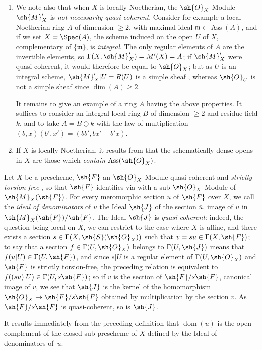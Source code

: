 \begin{remarks}[20.2.13]
\begin{enumerate}[label=(\roman*)]
  \item We note also that when $X$ is locally Noetherian, the $\sh{O}_X$-Module $\sh{M}'_X$ is \emph{not necessarily quasi-coherent}.
  Consider for example a local Noetherian ring $A$ of dimension $\geq 2$, with maximal ideal $\mathfrak{m}\in\operatorname{Ass}(A)$, and if we set $X=\Spec(A)$, the scheme induced on the open $U$ of $X$, complementary of $\{\mathfrak{m}\}$, is \emph{integral}.
  The only regular elements of $A$ are the invertible elements, so $\Gamma(X,\sh{M}'_X)=M'(X)=A$;
  if $\sh{M}'_X$ were quasi-coherent, it would therefore be equal to $\sh{O}_X$;
  but as $U$ is an integral scheme, $\sh{M}'_X|U=R(U)$ is a simple sheaf , whereas $\sh{O}_U$ is not a simple sheaf since $\dim(A)\geq 2$.

  It remains to give an example of a ring $A$ having the above properties.
  It suffices to consider an integral local ring $B$ of dimension $\geq 2$ and residue field $k$, and to take $A=B\oplus k$ with the law of multiplication $(b,x)(b',x')=(bb',bx'+b'x)$.

  \item If $X$ is locally Noetherian, it results from  that the schematically dense opens in $X$ are those which \emph{contain} $\operatorname{Ass}(\sh{O}_X)$.
\end{enumerate}
\end{remarks}

\begin{env}[20.2.14]
\label{IV.20.2.14}
Let $X$ be a prescheme, $\sh{F}$ an $\sh{O}_X$-Module quasi-coherent and \emph{strictly torsion-free} , so that $\sh{F}$ identifies via  with a sub-$\sh{O}_X$-Module of $\sh{M}_X(\sh{F})$.
For every meromorphic section $u$ of $\sh{F}$ over $X$, we call the \emph{ideal of denominators} of $u$ the Ideal $\sh{J}$ of the section $\overline{u}$, image of $u$ in $\sh{M}_X(\sh{F})/\sh{F}$.
The Ideal $\sh{J}$ is \emph{quasi-coherent}:
indeed, the question being local on $X$, we can restrict to the case where $X$ is affine, and there exists a section $s\in\Gamma(X,\sh{S}(\sh{O}_X))$ such that $v=su\in\Gamma(X,\sh{F})$;
to say that a section $f\in\Gamma(U,\sh{O}_X)$ belongs to $\Gamma(U,\sh{J})$ means that $f(u|U)\in\Gamma(U,\sh{F})$, and since $s|U$ is a regular element of $\Gamma(U,\sh{O}_X)$ and $\sh{F}$ is strictly torsion-free, the preceding relation is equivalent to $f((su)|U)\in\Gamma(U,s\sh{F})$;
so if $\overline{v}$ is the section of $\sh{F}/s\sh{F}$, canonical image of $v$, we see that $\sh{J}$ is the kernel of the homomorphism $\sh{O}_X\to\sh{F}/s\sh{F}$ obtained by multiplication by the section $\overline{v}$.
As $\sh{F}/s\sh{F}$ is quasi-coherent, so is $\sh{J}$.

It results immediately from the preceding definition that $\operatorname{dom}(u)$ is the open complement of the closed sub-prescheme of $X$ defined by the Ideal of denominators of~$u$.
\end{env}

